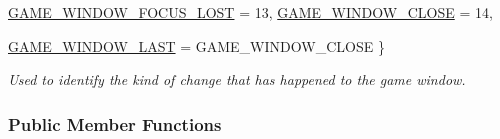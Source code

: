 \begin{DoxyCompactItemize}
\hyperlink{classphys_1_1EventGameWindow_a45225255070513d3cff88cdfea25cc09a0badc0a56b136f063cd0ae3cca06e77a}{GAME\_\-WINDOW\_\-FOCUS\_\-LOST} =  13, 
\hyperlink{classphys_1_1EventGameWindow_a45225255070513d3cff88cdfea25cc09a7dc01efd74badd9247854967433953d7}{GAME\_\-WINDOW\_\-CLOSE} =  14, 
\par
\hyperlink{classphys_1_1EventGameWindow_a45225255070513d3cff88cdfea25cc09ad6a39df788ee97efda258b46a776d61a}{GAME\_\-WINDOW\_\-LAST} =  GAME\_\-WINDOW\_\-CLOSE
 \}
\begin{DoxyCompactList}\small\item\em Used to identify the kind of change that has happened to the game window. \item\end{DoxyCompactList}\end{DoxyCompactItemize}
\subsubsection*{Public Member Functions}
